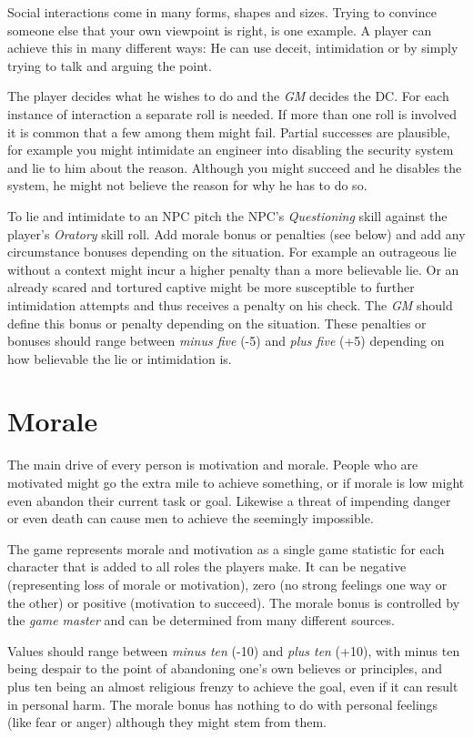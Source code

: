 Social interactions come in many forms, shapes and sizes. Trying to convince
someone else that your own viewpoint is right, is one example. A player can
achieve this in many different ways: He can use deceit, intimidation or by
simply trying to talk and arguing the point.

The player decides what he wishes to do and the \emph{GM} decides the DC. For
each instance of interaction a separate roll is needed. If more than one roll
is involved it is common that a few among them might fail. Partial successes
are plausible, for example you might intimidate an engineer into disabling the
security system and lie to him about the reason. Although you might succeed
and he disables the system, he might not believe the reason for why he has to
do so.

To lie and intimidate to an NPC pitch the NPC's \emph{Questioning} skill
against the player's \emph{Oratory} skill roll. Add morale bonus or penalties
(see below) and add any circumstance bonuses depending on the situation. For
example an outrageous lie without a context might incur a higher penalty than
a more believable lie. Or an already scared and tortured captive might be more
susceptible to further intimidation attempts and thus receives a penalty on
his check. The \emph{GM} should define this bonus or penalty depending on the
situation. These penalties or bonuses should range between \emph{minus five}
(-5) and \emph{plus five} (+5) depending on how believable the lie or
intimidation is.

\section{Morale}
\label{sec:7-Morale}

The main drive of every person is motivation and morale. People who are
motivated might go the extra mile to achieve something, or if morale is low
might even abandon their current task or goal. Likewise a threat of impending
danger or even death can cause men to achieve the seemingly impossible.

The game represents morale and motivation as a single game statistic for each
character that is added to all roles the players make. It can be negative
(representing loss of morale or motivation), zero (no strong feelings one way
or the other) or positive (motivation to succeed). The morale bonus is
controlled by the \emph{game master} and can be determined from many
different sources.

Values should range between \emph{minus ten} (-10) and \emph{plus ten} (+10),
with minus ten being despair to the point of abandoning one's own believes or
principles, and plus ten being an almost religious frenzy to achieve the
goal, even if it can result in personal harm. The morale bonus has nothing to
do with personal feelings (like fear or anger) although they might stem from
them.

